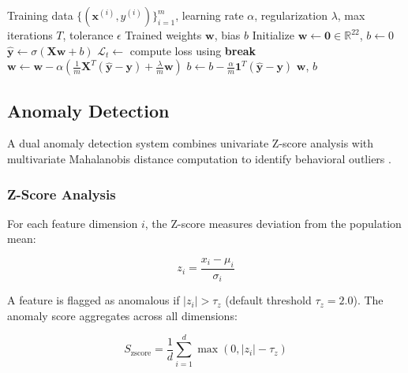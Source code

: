 \documentclass{article}
\begin{document}
\begin{algorithm}[H]
\caption{Logistic Regression Training with Gradient Descent}
\label{alg:gradient_descent}
\begin{algorithmic}[1]
\Require Training data $\{(\mathbf{x}^{(i)}, y^{(i)})\}_{i=1}^m$, learning rate $\alpha$, regularization $\lambda$, max iterations $T$, tolerance $\epsilon$
\Ensure Trained weights $\mathbf{w}$, bias $b$
\State Initialize $\mathbf{w} \leftarrow \mathbf{0} \in \mathbb{R}^{22}$, $b \leftarrow 0$
    \State $\hat{\mathbf{y}} \leftarrow \sigma(\mathbf{X} \mathbf{w} + b)$ 
    \State $\mathcal{L}_t \leftarrow$ compute loss using 
        \State \textbf{break} 
    \EndIf
    \State $\mathbf{w} \leftarrow \mathbf{w} - \alpha \left( \frac{1}{m} \mathbf{X}^T (\hat{\mathbf{y}} - \mathbf{y}) + \frac{\lambda}{m} \mathbf{w} \right)$ 
    \State $b \leftarrow b - \frac{\alpha}{m} \mathbf{1}^T (\hat{\mathbf{y}} - \mathbf{y})$ 
\EndFor
\State \Return $\mathbf{w}$, $b$
\end{algorithmic}
\end{algorithm}

\subsection{Anomaly Detection}

A dual anomaly detection system combines univariate Z-score analysis with multivariate Mahalanobis distance computation to identify behavioral outliers \cite{mahalanobis_distance}.

\subsubsection{Z-Score Analysis}

For each feature dimension $i$, the Z-score measures deviation from the population mean:

\begin{equation}
    z_i = \frac{x_i - \mu_i}{\sigma_i}
    \label{eq:zscore}
\end{equation}

A feature is flagged as anomalous if $|z_i| > \tau_z$ (default threshold $\tau_z = 2.0$). The anomaly score aggregates across all dimensions:

\begin{equation}
    S_{\text{zscore}} = \frac{1}{d} \sum_{i=1}^{d} \max(0, |z_i| - \tau_z)
    \label{eq:zscore_aggregate}
\end{equation}
\end{document}
